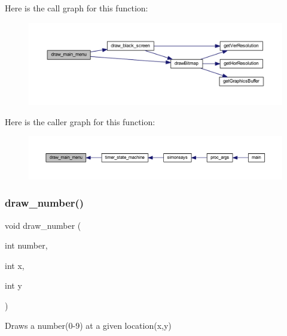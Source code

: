 Here is the call graph for this function\+:\nopagebreak
\begin{figure}[H]
\begin{center}
\leavevmode
\includegraphics[width=350pt]{group___bitmap_ga83361e027b6f0dd917305f1f82dedda3_cgraph}
\end{center}
\end{figure}
Here is the caller graph for this function\+:\nopagebreak
\begin{figure}[H]
\begin{center}
\leavevmode
\includegraphics[width=350pt]{group___bitmap_ga83361e027b6f0dd917305f1f82dedda3_icgraph}
\end{center}
\end{figure}
\mbox{\label{group___bitmap_ga97df0f6e4184d84c9e3871042b94bc3a}} 
\subsubsection{\texorpdfstring{draw\+\_\+number()}{draw\_number()}}
{\footnotesize\ttfamily void draw\+\_\+number (\begin{DoxyParamCaption}\item[{int}]{number,  }\item[{int}]{x,  }\item[{int}]{y }\end{DoxyParamCaption})}



Draws a number(0-\/9) at a given location(x,y) 


